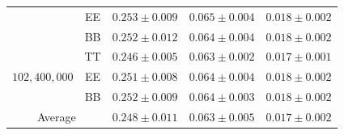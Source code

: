 \documentclass[apj]{emulateapj}
\begin{document}
\begin{table}[tbh]
\begin{center}
\begin{tabular}{c c c c c}
& EE  & $ 0.253 \pm 0.009 $  & $ 0.065 \pm 0.004 $  & $ 0.018 \pm 0.002 $ \\
& BB  & $ 0.252 \pm 0.012 $  & $ 0.064 \pm 0.004 $  & $ 0.018 \pm 0.002 $ \\
\hline
\multirow{3}{*}{$102,400,000$}  & TT  & $ 0.246 \pm 0.005 $  & $ 0.063 \pm 0.002 $  & $ 0.017 \pm 0.001 $ \\
& EE  & $ 0.251 \pm 0.008 $  & $ 0.064 \pm 0.004 $  & $ 0.018 \pm 0.002 $ \\
& BB  & $ 0.252 \pm 0.009 $  & $ 0.064 \pm 0.003 $  & $ 0.018 \pm 0.002 $ \\
\hline
\multicolumn{2}{c}{Average}  & $ 0.248 \pm 0.011 $  & $ 0.063 \pm 0.005 $  & $ 0.017 \pm 0.002 $ \\
\end{tabular}
 \normalsize
\end{center}
\end{table}
\end{document}
